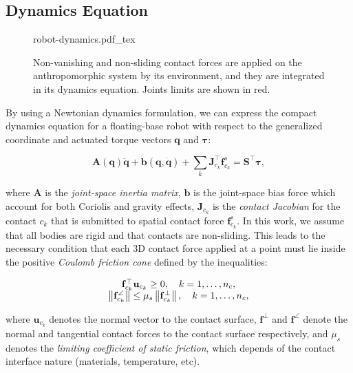 \subsection{Dynamics Equation}

\begin{figure}
  \centering
      {\def\svgwidth{0.4\linewidth}
        
                   {robot-dynamics.pdf_tex}
      }
      \caption{Non-vanishing and non-sliding contact forces are
        applied on the anthropomorphic system by its environment, and
        they are integrated in its dynamics equation. Joints limits
        are shown in red.}
      \label{fig:chap3-robot-dynamics}
\end{figure}

By using a Newtonian dynamics formulation, we can express the compact
dynamics equation for a floating-base robot with respect to the
generalized coordinate and actuated torque vectors $\mathbf{q}$ and
$\boldsymbol{\tau}$:

\begin{equation}
\label{dynamics-equation}
\mathbf{A}(\mathbf{q})\ddot{\mathbf{q}}
+\mathbf{b}(\mathbf{q},\dot{\mathbf{q}})
+\sum_k\mathbf{J}_{c_k}^\top\mathbf{f}^s_{c_k} =
\mathbf{S}^\top\boldsymbol{\tau},
\end{equation}

where $\mathbf{A}$ is the \emph{joint-space inertia matrix},
$\mathbf{b}$ is the joint-space bias force which account for both
Coriolis and gravity effects, $\mathbf{J}_{c_k}$ is the \emph{contact
  Jacobian} for the contact $c_k$ that is submitted to spatial contact
force $\mathbf{f}^s_{c_k}$. In this work, we assume that all bodies
are rigid and that contacts are non-sliding. This leads to the
necessary condition that each 3D contact force applied at a point must
lie inside the positive \emph{Coulomb friction cone} \cite{trinkle1997dynamic}
defined by the inequalities:

\begin{equation}
  \label{eq:chap3-friction-cone}
  \begin{array}{c}
    \mathbf{f}_{c_k}^{\top}\mathbf{u}_{c_k} \ge 0, \quad k=1,\dots,n_c, \\
    \left\lVert \mathbf{f}_{c_k}^\angle \right\rVert \le
    \mu_s\left\lVert \mathbf{f}_{c_k}^\bot \right\rVert, \quad k=1,\dots,n_c,
  \end{array}
\end{equation}

where $\mathbf{u}_{c_k}$ denotes the normal vector to the contact
surface, $\mathbf{f}^\bot$ and $\mathbf{f}^\angle$ denote the normal
and tangential contact forces to the contact surface respectively, and
$\mu_s$ denotes the \emph{limiting coefficient of static friction},
which depends of the contact interface nature (materials, temperature,
etc).

